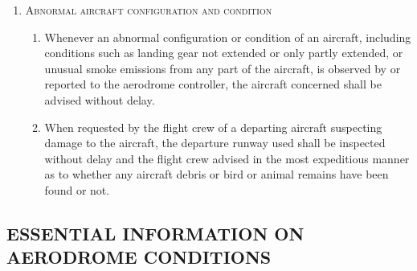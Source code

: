 \documentclass[../main.tex]{subfiles}
\begin{document}
\begin{enumerate}[itemsep=0.2cm]
\begin{enumerate}
        \end{enumerate}

        \item \textsc{Abnormal aircraft configuration and condition}
        \begin{enumerate}
            \item Whenever an abnormal configuration or condition of an aircraft, including conditions such as landing gear not extended or only partly extended, or unusual smoke emissions from any part of the aircraft, is observed by or reported to the aerodrome controller, the aircraft concerned shall be advised without delay.
            \item When requested by the flight crew of a departing aircraft suspecting damage to the aircraft, the departure runway used shall be inspected without delay and the flight crew advised in the most expeditious manner as to whether any aircraft debris or bird or animal remains have been found or not.
        \end{enumerate}
    \end{enumerate}

    \subsection[Essential information on aerodrome conditions]{ESSENTIAL INFORMATION ON AERODROME CONDITIONS}

    \begin{enumempty}[labelindent=\parindent]
        \item {}
    \end{enumempty}
\end{document}

